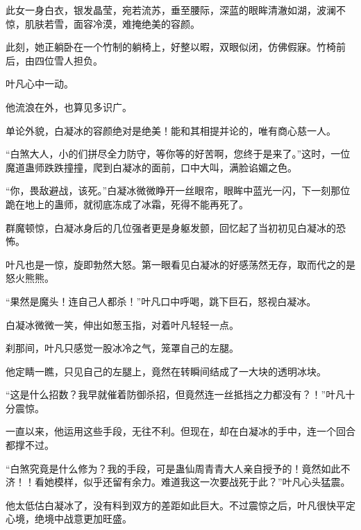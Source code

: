 \begin{this_body}
此女一身白衣，银发晶莹，宛若流苏，垂至腰际，深蓝的眼眸清澈如湖，波澜不惊，肌肤若雪，面容冷漠，难掩绝美的容颜。

此刻，她正躺卧在一个竹制的躺椅上，好整以暇，双眼似闭，仿佛假寐。竹椅前后，由四位雪人担负。

叶凡心中一动。

他流浪在外，也算见多识广。

单论外貌，白凝冰的容颜绝对是绝美！能和其相提并论的，唯有商心慈一人。

“白煞大人，小的们拼尽全力防守，等你等的好苦啊，您终于是来了。”这时，一位魔道蛊师跌跌撞撞，爬到白凝冰的面前，口中大叫，满脸谄媚之色。

“你，畏敌避战，该死。”白凝冰微微睁开一丝眼帘，眼眸中蓝光一闪，下一刻那位跪在地上的蛊师，就彻底冻成了冰霜，死得不能再死了。

群魔顿惊，白凝冰身后的几位强者更是身躯发颤，回忆起了当初初见白凝冰的恐怖。

叶凡也是一惊，旋即勃然大怒。第一眼看见白凝冰的好感荡然无存，取而代之的是怒火熊熊。

“果然是魔头！连自己人都杀！”叶凡口中呼喝，跳下巨石，怒视白凝冰。

白凝冰微微一笑，伸出如葱玉指，对着叶凡轻轻一点。

刹那间，叶凡只感觉一股冰冷之气，笼罩自己的左腿。

他定睛一瞧，只见自己的左腿上，竟然在转瞬间结成了一大块的透明冰块。

“这是什么招数？我早就催着防御杀招，但竟然连一丝抵挡之力都没有？！”叶凡十分震惊。

一直以来，他运用这些手段，无往不利。但现在，却在白凝冰的手中，连一个回合都撑不过。

“白煞究竟是什么修为？我的手段，可是蛊仙周青青大人亲自授予的！竟然如此不济！！看她模样，似乎还留有余力。难道我这一次要战死于此？”叶凡心头猛震。

他太低估白凝冰了，没有料到双方的差距如此巨大。不过震惊之后，叶凡很快平定心境，绝境中战意更加旺盛。

\end{this_body}

